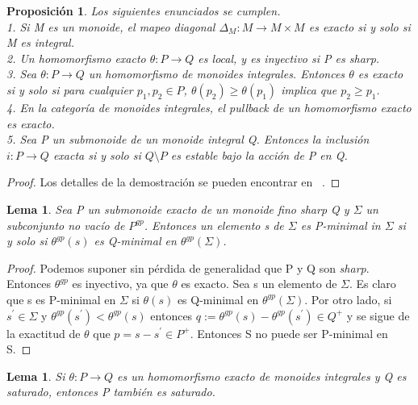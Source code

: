 \documentclass[12pt,spanish]{amsart}
\newtheorem{prop}[Theorem]{Proposición}
\newtheorem{lem}[Theorem]{Lema}
\theoremstyle{definition}
\theoremstyle{remark}
\begin{document}
\begin{prop}
Los siguientes enunciados se cumplen. \\ 
1. Si M es un monoide, el mapeo diagonal $\Delta_{M}:M \to M\times M$ es exacto si y solo si M es \textit{integral}. \\ 
2. Un homomorfismo exacto $\theta:P \to Q$ es local, y es inyectivo si P es \textit{sharp}. \\ 
3. Sea $\theta:P \to Q$ un homomorfismo de monoides \textit{integral}es. Entonces $\theta$ es exacto si y solo si para cualquier $p_{1},p_{2} \in P$, $\theta(p_{2}) \geq \theta(p_{1})$ implica que $p_{2}\geq p_{1}$. \\ 
4. En la categoría de monoides \textit{integral}es, el pullback de un homomorfismo exacto es exacto. \\ 
5. Sea P un submonoide de un monoide \textit{integral} Q. Entonces la inclusión $i:P \to Q$ exacta si y solo si $Q \setminus P$ es estable bajo la acción de P en Q. 
\end{prop}

\begin{proof}
Los detalles de la demostración se pueden encontrar en ~\cite{Ogus:2018aa}. 
\end{proof}

\begin{lem}
Sea P un submonoide exacto de un monoide fino \textit{sharp} Q y $\Sigma$ un subconjunto no vacío de $P^{gp}$. Entonces un elemento s de $\Sigma$ es P-minimal in $\Sigma$ si y solo si $\theta^{gp}(s)$ es Q-minimal en $\theta^{gp}(\Sigma)$.    
\end{lem}

\begin{proof}
Podemos suponer sin pérdida de generalidad que P y Q son \textit{sharp}. Entonces $\theta^{gp}$ es inyectivo, ya que $\theta$ es exacto. Sea s un elemento de $\Sigma$. Es claro que s es P-minimal en $\Sigma$ si $\theta(s)$ es Q-minimal en $\theta^{gp}(\Sigma)$. Por otro lado, si $s^{\prime}\in \Sigma$ y $\theta^{gp}(s^{\prime})< \theta^{gp}(s)$ entonces $q:=\theta^{gp}(s)-\theta^{gp}(s^{\prime})\in Q^{+}$ y se sigue de la exactitud de $\theta$ que $p=s-s^{\prime}\in P^{+}$. Entonces S no puede ser P-minimal en S.
\end{proof}

\begin{lem}
Si $\theta: P \to Q$ es un homomorfismo exacto de monoides \textit{integral}es y Q es saturado, entonces P también es saturado.  
\end{lem}
\end{document}

